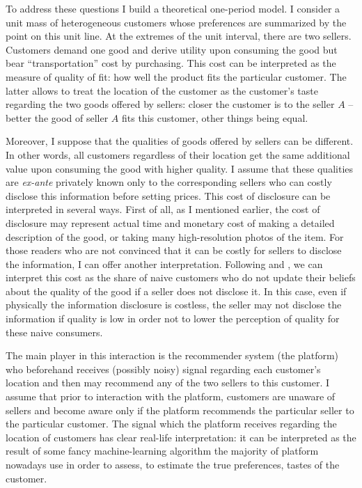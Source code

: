 \documentclass[a4paper]{article}
\begin{document}
 
 	
	To address these questions I build a theoretical one-period model. I consider a unit mass of heterogeneous customers whose preferences are summarized by the point on this unit line. At the extremes of the unit interval, there are two sellers. Customers demand one good and derive utility upon consuming the good but bear ``transportation'' cost by purchasing. This cost can be interpreted as the measure of quality of fit: how well the product fits the particular customer. The latter allows to treat the location of the customer as the customer's taste regarding the two goods offered by sellers: closer the customer is to the seller $A$ -- better the good of seller $A$ fits this customer, other things being equal. 
	
	
	
	
	Moreover, I suppose that the qualities of goods offered by sellers can be different. In other words, all customers regardless of their location get the same additional value upon consuming the good with higher quality. I assume that these qualities are \textit{ex-ante} privately known only to the corresponding sellers who can costly disclose this information before setting prices. This cost of disclosure can be interpreted in several ways. First of all, as I mentioned earlier, the cost of disclosure may represent actual time and monetary cost of making a detailed description of the good, or taking many high-resolution photos of the item. For those readers who are not convinced that it can be costly for sellers to disclose the information, I can offer another interpretation. Following \cite{levin2009quality} and \cite{hirshleifer2002disclosure}, we can interpret this cost as the share of naive customers who do not update their beliefs about the quality of the good if a seller does not disclose it. In this case, even if physically the information disclosure is costless, the seller may not disclose the information if quality is low in order not to lower the perception of quality for these naive consumers.
	 
	
	
	
	
	The main player in this interaction is the recommender system (the platform) who beforehand receives (possibly noisy) signal regarding each customer's location and then may recommend any of the two sellers to this customer. I assume that prior to interaction with the platform, customers are unaware of sellers and become aware only if the platform recommends the particular seller to the particular customer. The signal which the platform receives regarding the location of customers has clear real-life interpretation: it can be interpreted as the result of some fancy machine-learning algorithm the majority of platform nowadays use in order to assess, to estimate the true preferences, tastes of the customer. 
	
\end{document}
